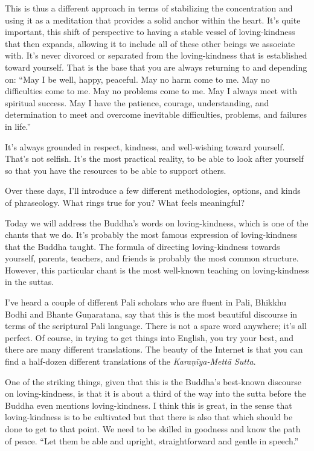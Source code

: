 This is thus a different approach in terms of stabilizing the
concentration and using it as a meditation that provides a solid anchor
within the heart. It’s quite important, this shift of perspective to
having a stable vessel of loving-kindness that then expands, allowing it
to include all of these other beings we associate with. It’s never
divorced or separated from the loving-kindness that is established
toward yourself. That is the base that you are always returning to and
depending on: “May I be well, happy, peaceful. May no harm come to me.
May no difficulties come to me. May no problems come to me. May I always
meet with spiritual success. May I have the patience, courage,
understanding, and determination to meet and overcome inevitable
difficulties, problems, and failures in life.”

It’s always grounded in respect, kindness, and well-wishing toward
yourself. That’s not selfish. It’s the most practical reality, to be
able to look after yourself so that you have the resources to be able to
support others.

Over these days, I’ll introduce a few different methodologies, options,
and kinds of phraseology. What rings true for you? What feels
meaningful?

Today we will address the Buddha’s words on loving-kindness, which is
one of the chants that we do. It’s probably the most famous expression
of loving-kindness that the Buddha taught. The formula of directing
loving-kindness towards yourself, parents, teachers, and friends is
probably the most common structure. However, this particular chant is
the most well-known teaching on loving-kindness in the suttas.

I’ve heard a couple of different Pali scholars who are fluent in Pali,
Bhikkhu Bodhi and Bhante Guṇaratana, say that this is the most beautiful
discourse in terms of the scriptural Pali language. There is not a spare
word anywhere; it’s all perfect. Of course, in trying to get things into
English, you try your best, and there are many different translations.
The beauty of the Internet is that you can find a half-dozen different
translations of the \emph{Karaṇīya-Mettā Sutta}.

One of the striking things, given that this is the Buddha’s best-known
discourse on loving-kindness, is that it is about a third of the way
into the sutta before the Buddha even mentions loving-kindness. I think
this is great, in the sense that loving-kindness is to be cultivated but
that there is also that which should be done to get to that point. We
need to be skilled in goodness and know the path of peace. “Let them be
able and upright, straightforward and gentle in speech.”


